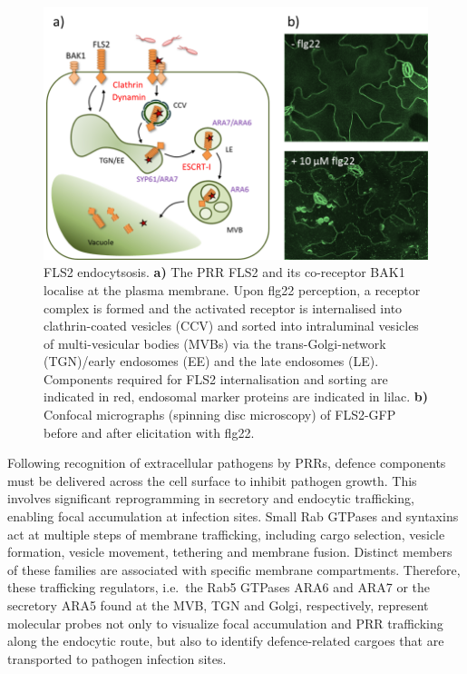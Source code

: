\documentclass[12pt,]{book}
\theoremstyle{definition}
\theoremstyle{definition}
\theoremstyle{remark}
\begin{document}
\begin{figure}
\includegraphics[width=4.9in]{assets/sr_fig1_prac} \caption{FLS2 endocytsosis. \textbf{a)} The PRR FLS2 and its
co-receptor BAK1 localise at the plasma membrane. Upon flg22 perception,
a receptor complex is formed and the activated receptor is internalised
into clathrin-coated vesicles (CCV) and sorted into intraluminal
vesicles of multi-vesicular bodies (MVBs) via the trans-Golgi-network
(TGN)/early endosomes (EE) and the late endosomes (LE). Components
required for FLS2 internalisation and sorting are indicated in red,
endosomal marker proteins are indicated in lilac. \textbf{b)} Confocal
micrographs (spinning disc microscopy) of FLS2-GFP before and after
elicitation with flg22.}\label{fig:srfig}
\end{figure}

Following recognition of extracellular pathogens by PRRs, defence
components must be delivered across the cell surface to inhibit pathogen
growth. This involves significant reprogramming in secretory and
endocytic trafficking, enabling focal accumulation at infection sites.
Small Rab GTPases and syntaxins act at multiple steps of membrane
trafficking, including cargo selection, vesicle formation, vesicle
movement, tethering and membrane fusion. Distinct members of these
families are associated with specific membrane compartments. Therefore,
these trafficking regulators, i.e.~the Rab5 GTPases ARA6 and ARA7 or the
secretory ARA5 found at the MVB, TGN and Golgi, respectively, represent
molecular probes not only to visualize focal accumulation and PRR
trafficking along the endocytic route, but also to identify
defence-related cargoes that are transported to pathogen infection
sites.

\newpage
\end{document}
